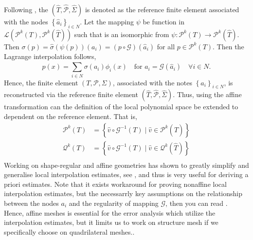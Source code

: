 Following \cite[Example 9.4]{ErnGuermond2021}, the $ ( \hat{T}, \hat{\mathcal{P} }, \hat{\Sigma} ) $ is denoted as the reference finite element associated with the nodes $\left\{ \hat{a}_{i} \right\}_{i\in N} $. Let the mapping $\psi $ be function in $\mathcal{L}( \mathcal{P} ^{k}( T), \mathcal{P} ^{k}(\hat{T}
)  )  $ such that is an isomorphic from  $ \psi : \mathcal{P} ^{k}( T) \to \mathcal{P} ^{k}( \hat{T})   $.  Then $\sigma ( p) = \hat{\sigma }( \psi ( p) ) (a_{i} )  = ( p \circ \mathcal{G} )( \hat{a}_{i})      $ for all $p \in \mathcal{P}^{k}( T)  $.
Then the Lagrange interpolation follows,  \[
    p (x) = \sum_{i \in N }^{} \sigma ( a_{i}) \phi_{i}( x) \quad \text{for } a_{i} = \mathcal{G}( \hat{a}_{i}) \quad  \forall i \in N     .
\]
Hence, the finite element $( T, \mathcal{P}, \Sigma  ) $, associated with the notes $\left\{ a_{i} \right\}_{i\in N} $, is reconstructed via the reference finite element $( \hat{T}, \hat{\mathcal{P} }, \hat{\Sigma} ) $.
Thus, using the affine transformation can the definition of the local polynomial space be extended to dependent on the reference element. That is, \[
    \begin{split}
\mathcal{P}^{k}( T) & = \left\{ \hat{v} \circ  \mathcal{G}^{-1}( T)   \mid  \hat{v} \in \mathcal{P}^{k}( \hat{T})      \right\} \\
\mathcal{Q}^{k}( T) & = \left\{ \hat{v} \circ  \mathcal{G}^{-1}( T)     \mid  \hat{v} \in \mathcal{Q}^{k}( \hat{T})      \right\} \\
    \end{split}
\]
Working on shape-regular and affine geometries has shown to greatly simplify and generalise local interpolation estimates, see \cite[Theorem 11.12]{ErnGuermond2021}, and thus is very useful for deriving a priori estimates. Note that it exists
workaround for proving nonaffine local interpolation estimates, but the necessarrly key assumptions on the relationship between the nodes $a_{i}$ and the regularity of mapping $\mathcal{G} $, then you can read \cite[Chapter 13]{ErnGuermond2021}.
Hence, affine meshes is essential for the error analysis which utilize the interpolation estimates, but it limits us to work on structure mesh if we specifically choose on quadrilateral meshes..

